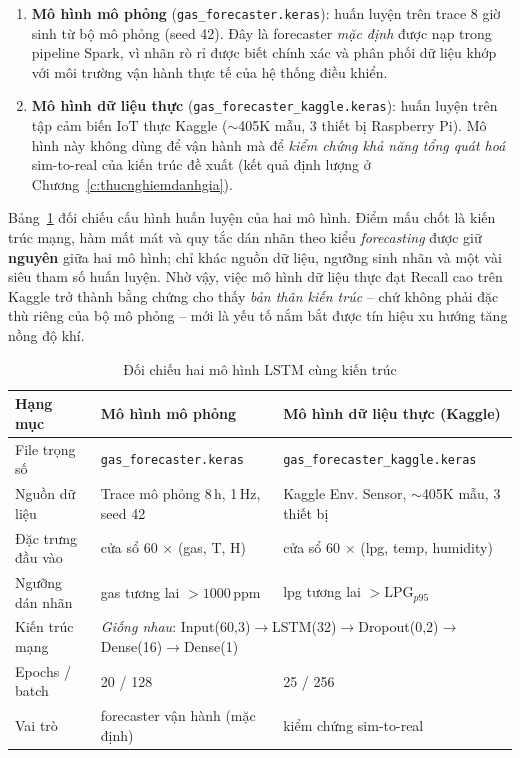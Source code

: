 \begin{enumerate}
  \item \textbf{Mô hình mô phỏng} (\texttt{gas\_forecaster.keras}): huấn luyện trên trace 8 giờ sinh từ bộ mô phỏng (seed 42). Đây là forecaster \emph{mặc định} được nạp trong pipeline Spark, vì nhãn rò rỉ được biết chính xác và phân phối dữ liệu khớp với môi trường vận hành thực tế của hệ thống điều khiển.
  \item \textbf{Mô hình dữ liệu thực} (\texttt{gas\_forecaster\_kaggle.keras}): huấn luyện trên tập cảm biến IoT thực Kaggle ($\sim$405K mẫu, 3 thiết bị Raspberry Pi). Mô hình này không dùng để vận hành mà để \emph{kiểm chứng khả năng tổng quát hoá} sim-to-real của kiến trúc đề xuất (kết quả định lượng ở Chương~\ref{c:thucnghiemdanhgia}).
\end{enumerate}

Bảng~\ref{tab:lstm_two_models} đối chiếu cấu hình huấn luyện của hai mô hình. Điểm mấu chốt là kiến trúc mạng, hàm mất mát và quy tắc dán nhãn theo kiểu \emph{forecasting} được giữ \textbf{nguyên} giữa hai mô hình; chỉ khác nguồn dữ liệu, ngưỡng sinh nhãn và một vài siêu tham số huấn luyện. Nhờ vậy, việc mô hình dữ liệu thực đạt Recall cao trên Kaggle trở thành bằng chứng cho thấy \emph{bản thân kiến trúc} -- chứ không phải đặc thù riêng của bộ mô phỏng -- mới là yếu tố nắm bắt được tín hiệu xu hướng tăng nồng độ khí.

\begin{table}[H]
\centering
\caption{Đối chiếu hai mô hình LSTM cùng kiến trúc}
\label{tab:lstm_two_models}
\small
\begin{tabular}{p{3.2cm}p{4.4cm}p{4.6cm}}
\toprule
\textbf{Hạng mục} & \textbf{Mô hình mô phỏng} & \textbf{Mô hình dữ liệu thực (Kaggle)} \\
\midrule
File trọng số   & \texttt{gas\_forecaster.keras} & \texttt{gas\_forecaster\_kaggle.keras} \\
Nguồn dữ liệu   & Trace mô phỏng 8\,h, 1\,Hz, seed 42 & Kaggle Env. Sensor, $\sim$405K mẫu, 3 thiết bị \\
Đặc trưng đầu vào & cửa sổ 60 $\times$ (gas, T, H) & cửa sổ 60 $\times$ (lpg, temp, humidity) \\
Ngưỡng dán nhãn & gas tương lai $> 1000$\,ppm & lpg tương lai $> \mathrm{LPG}_{p95}$ \\
Kiến trúc mạng  & \multicolumn{2}{l}{\emph{Giống nhau}: Input(60,3)$\to$LSTM(32)$\to$Dropout(0,2)$\to$Dense(16)$\to$Dense(1)} \\
Epochs / batch  & 20 / 128 & 25 / 256 \\
Vai trò         & forecaster vận hành (mặc định) & kiểm chứng sim-to-real \\
\bottomrule
\end{tabular}
\end{table}

